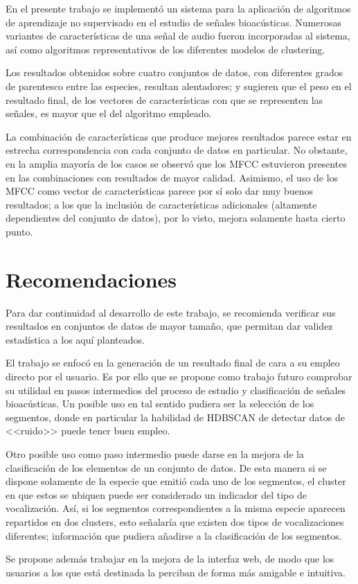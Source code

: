 En el presente trabajo se implementó un sistema para la aplicación de algoritmos de aprendizaje no supervisado en el estudio de señales bioacústicas.
Numerosas variantes de características de una señal de audio fueron incorporadas al sistema, así como algoritmos representativos de los diferentes modelos de clustering.

Los resultados obtenidos sobre cuatro conjuntos de datos, con diferentes grados de parentesco entre las especies, resultan alentadores;
y sugieren que el peso en el resultado final, de los vectores de características con que se representen las señales, es mayor que el del algoritmo empleado.

La combinación de características que produce mejores resultados parece estar en estrecha correspondencia con cada conjunto de datos en particular.
No obstante, en la amplia mayoría de los casos se observó que los MFCC estuvieron presentes en las combinaciones con resultados de mayor calidad.
Asimismo, el uso de los MFCC como vector de características parece por sí solo dar muy buenos resultados;
a los que la inclusión de características adicionales (altamente dependientes del conjunto de datos), por lo visto, mejora solamente hasta cierto punto.

\section*{Recomendaciones}\label{sec:recomendaciones}

Para dar continuidad al desarrollo de este trabajo, se recomienda verificar sus resultados en conjuntos de datos de mayor tamaño, que permitan dar validez estadística a los aquí planteados.

El trabajo se enfocó en la generación de un resultado final de cara a su empleo directo por el usuario.
Es por ello que se propone como trabajo futuro comprobar su utilidad en pasos intermedios del proceso de estudio y clasificación de señales bioacústicas.
Un posible uso en tal sentido pudiera ser la selección de los segmentos, donde en particular la habilidad de HDBSCAN de detectar datos de <<ruido>> puede tener buen empleo.

Otro posible uso como paso intermedio puede darse en la mejora de la clasificación de los elementos de un conjunto de datos.
De esta manera si se dispone solamente de la especie que emitió cada uno de los segmentos, el cluster en que estos se ubiquen puede ser considerado un indicador del tipo de vocalización.
Así, si los segmentos correspondientes a la misma especie aparecen repartidos en dos clusters, esto señalaría que existen dos tipos de vocalizaciones diferentes;
información que pudiera añadirse a la clasificación de los segmentos.

Se propone además trabajar en la mejora de la interfaz web, de modo que los usuarios a los que está destinada la perciban de forma más amigable e intuitiva.